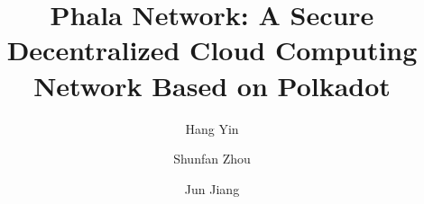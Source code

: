 \documentclass{article}
\begin{document}
\title{Phala Network: A Secure Decentralized Cloud Computing Network Based on Polkadot}

\author{
    Hang Yin
    \and
    Shunfan Zhou
    \and
    Jun Jiang
}

\maketitle

% 







\end{document}
